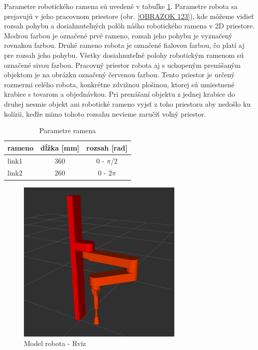 Parametre robotického ramena sú uvedené v tabuľke  \ref{table 1.2}.  Parametre robota sa prejavujú v jeho pracovnom priestore (obr. \ref{OBRAZOK 123}), kde môžeme vidieť rozsah pohybu a dosiahnuteľných polôh nášho robotického ramena v 2D priestore.  Modrou farbou je označené prvé rameno, rozsah jeho pohybu je vyznačený rovnakou farbou. Druhé rameno robota je označené fialovou farbou, čo platí aj pre rozsah jeho pohybu. Všetky dosiahnuteľné polohy robotickým ramenom sú označené sivou farbou. Pracovný priestor robota aj s uchopeným prenášaným objektom je na obrázku označený červenou farbou. Tento priestor je určený rozmermi celého robota, konkrétne zdvižnou plošinou, ktorej sú umiestnené krabice s tovarom a objednávkou. Pri prenášaní objektu z jednej krabice do druhej nesmie objekt ani robotické rameno vyjsť z toho priestoru aby nedošlo ku kolízii, keďže mimo tohoto rozsahu nevieme zaručiť voľný priestor. 
\begin{table}[]
	\centering
	\begin{tabular}{|l|c|c|}
		\hline
		rameno   & \multicolumn{1}{l|}{dĺžka {[}mm{]}} & \multicolumn{1}{l|}{rozsah {[}rad{]}} \\ \hline
		link1 & 360                                 & 0 - $\pi$/2                              \\ \hline
		link2 & 260                                 & 0 - 2$\pi$                           \\ \hline
	\end{tabular}
	\caption{Parametre ramena}\label{table 1.2} 
\end{table}

\begin{figure}[]
	\centering
	\includegraphics[width=80mm]{img/SCARA2.png}
	\caption{Model robota - Rviz}\label{OBRAZOK 122} 
\end{figure} 


